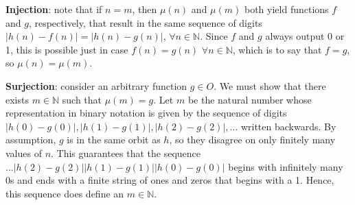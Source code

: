 \documentclass[12pt,letterpaper]{article}
\begin{document}
\begin{enumerate}
\begin{enumerate}
{\textbf{Injection}: note that if $n=m$, then $\mu(n)$ and $\mu(m)$ both yield functions $f$ and $g$, respectively, that result in the same sequence of digits $|h(n)-f(n)| = |h(n)-g(n)| $, $\forall n \in \mathbb{N}$. Since $f$ and $g$ always output 0 or 1, this is possible just in case $f(n) = g(n)$ $\forall n \in \mathbb{N}$, which is to say that $f=g$, so $\mu(n)=\mu(m)$.  

\textbf{Surjection}: consider an arbitrary function $g \in O$. We must show that there exists $m \in \mathbb{N}$ such that $\mu(m) = g$. Let $m$ be the natural number whose representation in binary notation is given by the sequence of digits $|h(0)-g(0)|, |h(1)-g(1)|, |h(2)-g(2)|, \ldots$ written backwards. By assumption, $g$ is in the same orbit as $h$, so they disagree on only finitely many values of $n$. This guarantees that the sequence $\ldots |h(2)-g(2)| |h(1)-g(1)| |h(0)-g(0)| $ begins with infinitely many 0s and ends with a finite string of ones and zeros that begins with a 1. Hence, this sequence does define an $m \in \mathbb{N}$. 

}




\end{enumerate}

\end{enumerate}
\end{document}
